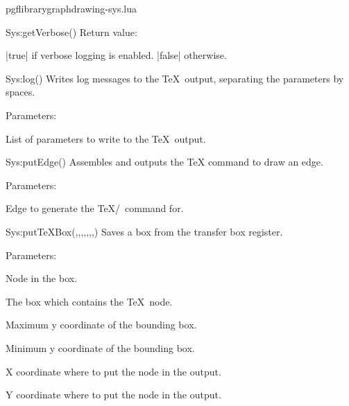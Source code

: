 \begin{filedescription}{pgflibrarygraphdrawing-sys.lua}
\begin{luacommand}{{Sys:getVerbose}()}
Return value:
\begin{parameterdescription} 
  \item[] |true| if verbose logging is enabled. |false| otherwise. 
\end{parameterdescription}


\end{luacommand}
\begin{luacommand}{{Sys:log}()}
Writes log messages to the \TeX\ output, separating the parameters by spaces. 

Parameters:
\begin{parameterdescription}
	\item[\meta{...}] List of parameters to write to the \TeX\ output. 
\end{parameterdescription}



\end{luacommand}
\begin{luacommand}{{Sys:putEdge}()}
Assembles and outputs the TeX command to draw an edge. 

Parameters:
\begin{parameterdescription}
	\item[\meta{edge}] Edge to generate the \TeX/\tikzname\ command for. 
\end{parameterdescription}



\end{luacommand}
\begin{luacommand}{{Sys:putTeXBox}(,,,,,,,)}
Saves a box from the transfer box register. 

Parameters:
\begin{parameterdescription}
	\item[\meta{node}] Node in the box.\item[\meta{texnode}] The box which contains the \TeX\ node.\item[\meta{minX}] Maximum y coordinate of the bounding box.\item[\meta{minY}] Minimum y coordinate of the bounding box.\item[\meta{posX}] X coordinate where to put the node in the output.\item[\meta{posY}] Y coordinate where to put the node in the output. 
\end{parameterdescription}




\end{luacommand}
\end{filedescription}
